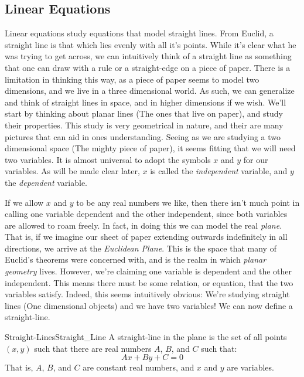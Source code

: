 \documentclass[crop=false,class=book,oneside]{standalone}                      %
\begin{document}
        \subsection{Linear Equations}
            Linear equations study equations that model straight lines.
            From Euclid, a straight line is that which lies evenly with all
            it's points. While it's clear what he was trying to get across, we
            can intuitively think of a straight line as something that one can
            draw with a rule or a straight-edge on a piece of paper. There is
            a limitation in thinking this way, as a piece of paper seems to
            model two dimensions, and we live in a three dimensional
            world. As such, we can generalize and think of straight lines in
            space, and in higher dimensions if we wish. We'll start by thinking
            about planar lines (The ones that live on paper), and study their
            properties. This study is very geometrical in nature, and their are
            many pictures that can aid in ones understanding. Seeing as we are
            studying a two dimensional space (The mighty piece of paper), it
            seems fitting that we will need two variables. It is almost
            universal to adopt the symbols $x$ and $y$ for our variables. As
            will be made clear later, $x$ is called the \textit{independent}
            variable, and $y$ the \textit{dependent} variable.
            \par\hfill\par
            If we allow $x$ and $y$ to be any real numbers we like, then there
            isn't much point in calling one variable dependent and the other
            independent, since both variables are allowed to roam freely.
            In fact, in doing this we can model the real \textit{plane}. That
            is, if we imagine our sheet of paper extending outwards indefinitely
            in all directions, we arrive at the \textit{Euclidean Plane}. This
            is the space that many of Euclid's theorems were concerned with,
            and is the realm in which \textit{planar geometry} lives. However,
            we're claiming one variable is dependent and the other independent.
            This means there must be some relation, or equation, that the
            two variables satisfy. Indeed, this seems intuitively obvious:
            We're studying straight lines (One dimensional objects) and we
            have two variables! We can now define a straight-line.
            \begin{ldefinition}{Straight-Lines}{Straight_Line}
                A straight-line in the plane is the set of all points $(x,y)$
                such that there are real numbers $A$, $B$, and $C$ such that:
                \begin{equation}
                    Ax+By+C=0
                \end{equation}
                That is, $A$, $B$, and $C$ are constant real numbers, and
                $x$ and $y$ are variables.
            \end{ldefinition}
\end{document}
